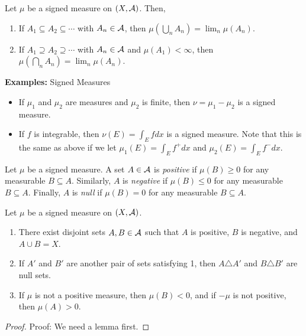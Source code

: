 \begin{lemma}
    Let $\mu$ be a signed measure on $(X, \cal{A})$. Then,
    \begin{enumerate}
        \item If $A_1 \subseteq A_2 \subseteq \cdots$ with $A_n \in \cal{A}$, then $\mu\left(\bigcup_{n} A_n\right) = \lim_{n} \mu(A_n)$.
        \item If $A_1 \supseteq A_2 \supseteq \cdots$ with $A_n \in \cal{A}$ and $\mu(A_1) < \infty$, then $\mu\left(\bigcap_{n} A_n\right) = \lim_{n} \mu(A_n)$.
    \end{enumerate}
\end{lemma}

\begin{example}{\textbf{Examples:} Signed Measures}
    \vspace{-0.5cm}
    \begin{itemize}
        \item If $\mu_1$ and $\mu_2$ are measures and $\mu_2$ is finite, then $\nu = \mu_1 - \mu_2$ is a signed measure.
        \item If $f$ is integrable, then $\nu(E) = \int_{E} f dx$ is a signed measure. Note that this is the same as above if we let $\mu_1(E) = \int_{E} f^{+} dx$ and $\mu_2(E) = \int_{E} f^{-} dx$.
    \end{itemize}
\end{example}

\begin{definition}
    Let $\mu$ be a signed measure. A set $A \in \cal{A}$ is \emph{positive} if $\mu(B) \geq 0$ for any measurable $B \subseteq A$. Similarly, $A$ is \emph{negative} if $\mu(B) \leq 0$ for any measurable $B \subseteq A$. Finally, $A$ is \emph{null} if $\mu(B) = 0$ for any measurable $B \subseteq A$.
\end{definition}

\begin{lemma}
    Let $\mu$ be a signed measure on $(X, \cal{A})$.
    \begin{enumerate}
        \item There exist disjoint sets $A, B \in \cal{A}$ such that $A$ is positive, $B$ is negative, and $A \cup B = X$. 
        \item If $A'$ and $B'$ are another pair of sets satisfying 1, then $A \triangle A'$ and $B \triangle B'$ are null sets.
        \item If $\mu$ is not a positive measure, then $\mu(B) < 0$, and if $-\mu$ is not positive, then $\mu(A) > 0$.
    \end{enumerate}
\end{lemma}
\begin{proof}{Proof:}
    We need a lemma first.
\end{proof}

